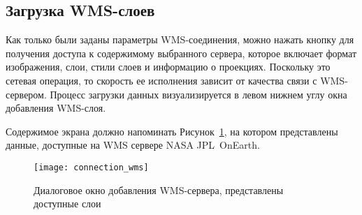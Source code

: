 
\subsection{Загрузка WMS-слоев}\label{sec:ogc-wms-layers}

Как только были заданы параметры WMS-соединения, можно нажать кнопку
 для получения доступа к содержимому выбранного
сервера, которое включает формат изображения, слои, стили слоев и
информацию о проекциях. Поскольку это сетевая операция, то скорость ее
исполнения зависит от качества связи с WMS-сервером. Процесс загрузки
данных визуализируется в левом нижнем углу окна добавления WMS-слоя.

Содержимое экрана должно напоминать Рисунок~\ref{fig:connection_wms}, на
котором представлены данные, доступные на WMS сервере NASA JPL~OnEarth.

\begin{figure}[ht]
  \centering
  \texttt{[image: connection\_wms]}
  \caption{Диалоговое окно добавления WMS-сервера, представлены доступные слои
  \wincaption}\label{fig:connection_wms}
\end{figure}

